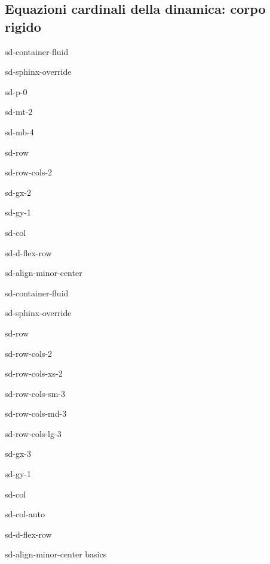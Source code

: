 \documentclass[letterpaper,10pt,english]{jupyterBook}
\begin{document}
\subsection{Equazioni cardinali della dinamica: corpo rigido}
\label{\detokenize{ch/dynamics-eom-rigid:equazioni-cardinali-della-dinamica-corpo-rigido}}\label{\detokenize{ch/dynamics-eom-rigid:classical-mechanics-dynamics-eom-rigid}}\label{\detokenize{ch/dynamics-eom-rigid::doc}}
\sphinxstepscope

\begin{sphinxuseclass}{sd-container-fluid}
\begin{sphinxuseclass}{sd-sphinx-override}
\begin{sphinxuseclass}{sd-p-0}
\begin{sphinxuseclass}{sd-mt-2}
\begin{sphinxuseclass}{sd-mb-4}
\begin{sphinxuseclass}{sd-row}
\begin{sphinxuseclass}{sd-row-cols-2}
\begin{sphinxuseclass}{sd-gx-2}
\begin{sphinxuseclass}{sd-gy-1}
\begin{sphinxuseclass}{sd-col}
\begin{sphinxuseclass}{sd-d-flex-row}
\begin{sphinxuseclass}{sd-align-minor-center}
\begin{sphinxuseclass}{sd-container-fluid}
\begin{sphinxuseclass}{sd-sphinx-override}
\begin{sphinxuseclass}{sd-row}
\begin{sphinxuseclass}{sd-row-cols-2}
\begin{sphinxuseclass}{sd-row-cols-xs-2}
\begin{sphinxuseclass}{sd-row-cols-sm-3}
\begin{sphinxuseclass}{sd-row-cols-md-3}
\begin{sphinxuseclass}{sd-row-cols-lg-3}
\begin{sphinxuseclass}{sd-gx-3}
\begin{sphinxuseclass}{sd-gy-1}
\begin{sphinxuseclass}{sd-col}
\begin{sphinxuseclass}{sd-col-auto}
\begin{sphinxuseclass}{sd-d-flex-row}
\begin{sphinxuseclass}{sd-align-minor-center}
\sphinxAtStartPar
basics


\end{sphinxuseclass}
\end{sphinxuseclass}
\end{sphinxuseclass}
\end{sphinxuseclass}
\end{sphinxuseclass}
\end{sphinxuseclass}
\end{sphinxuseclass}
\end{sphinxuseclass}
\end{sphinxuseclass}
\end{sphinxuseclass}
\end{sphinxuseclass}
\end{sphinxuseclass}
\end{sphinxuseclass}
\end{sphinxuseclass}
\end{sphinxuseclass}
\end{sphinxuseclass}
\end{sphinxuseclass}
\end{sphinxuseclass}
\end{sphinxuseclass}
\end{sphinxuseclass}
\end{sphinxuseclass}
\end{sphinxuseclass}
\end{sphinxuseclass}
\end{sphinxuseclass}
\end{sphinxuseclass}
\end{sphinxuseclass}
\end{document}
